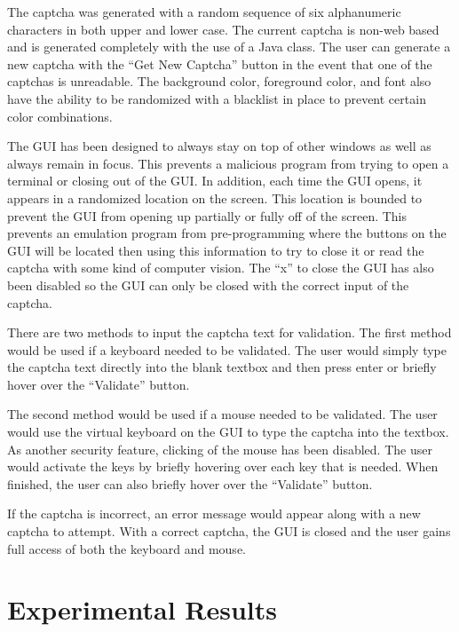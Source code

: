 \documentclass[pagenumbers]{ieee}
\begin{document}
The captcha was generated with a random sequence of six alphanumeric characters in both upper and lower case. The current captcha is non-web based and is generated completely with the use of a Java class. The user can generate a new captcha with the ``Get New Captcha'' button in the event that one of the captchas is unreadable. The background color, foreground color, and font also have the ability to be randomized with a blacklist in place to prevent certain color combinations.

The GUI has been designed to always stay on top of other windows as well as always remain in focus. This prevents a malicious program from trying to open a terminal or closing out of the GUI. In addition, each time the GUI opens, it appears in a randomized location on the screen. This location is bounded to prevent the GUI from opening up partially or fully off of the screen. This prevents an emulation program from pre-programming where the buttons on the GUI will be located then using this information to try to close it or read the captcha with some kind of computer vision. The ``x'' to close the GUI has also been disabled so the GUI can only be closed with the correct input of the captcha.

There are two methods to input the captcha text for validation. The first method would be used if a keyboard needed to be validated. The user would simply type the captcha text directly into the blank textbox and then press enter or briefly hover over the ``Validate'' button.

The second method would be used if a mouse needed to be validated. The user would use the virtual keyboard on the GUI to type the captcha into the textbox. As another security feature, clicking of the mouse has been disabled. The user would activate the keys by briefly hovering \cite{hover} over each key that is needed. When finished, the user can also briefly hover over the ``Validate'' button.

If the captcha is incorrect, an error message would appear along with a new captcha to attempt. With a correct captcha, the GUI is closed and the user gains full access of both the keyboard and mouse.


\section{Experimental Results}
\label{section:experimental}
\end{document}
